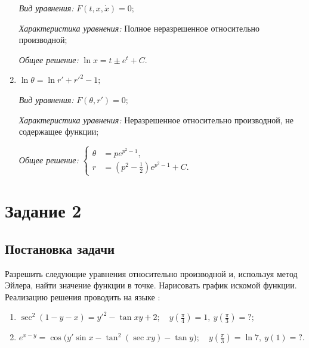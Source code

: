 \documentclass[14pt, a4paper, titlepage, fleqn]{extarticle}
\begin{document}
\begin{enumerate}
                    \textit{Вид уравнения:} \( F \left( t, x, \dot{x} \right) = 0; \)

                    \textit{Характеристика уравнения:}
                        Полное неразрешенное относительно производной;

                    \textit{Общее решение:} \( \ln{x} = t \pm e^t + C. \)

                
                \item \( \ln{\theta} = \ln{r'} + r'^2 - 1; \)
                
                    \textit{Вид уравнения:} \( F \left( \theta, r' \right) = 0; \)

                    \textit{Характеристика уравнения:}
                        Неразрешенное относительно производной, не содержащее функции;

                    \textit{Общее решение:}
                        \(
                            \left\lbrace
                                \begin{aligned}
                                    \theta &= p e^{p^2-1}, \\
                                    r &= \left( p^2 - \frac{1}{2} \right) e^{p^2-1} + C.
                                \end{aligned}
                            \right.    
                        \)

            \end{enumerate}

            
    \pagebreak

    \section{Задание 2}
        \subsection{Постановка задачи}
            Разрешить следующие уравнения относительно производной и, 
            используя метод Эйлера, найти значение функции в точке. 
            Нарисовать график искомой функции. 
            Реализацию решения проводить на языке :

            \begin{enumerate}
                \item \( \sec^2{(1 -y- x)} = y'^2 - \tan{xy} + 2; \quad y \left( \frac{\pi}{4} \right) = 1, ~ y \left( \frac{\pi}{3} \right) = ?;  \)
                \item \( e^{x-y} = \cos\big( y' \sin{x} - \tan^2(\sec{xy}) - \tan{y} \big); \quad y \left( \frac{\pi}{3} \right) = \ln 7, ~ y(1) = ?. \)
            \end{enumerate}
\end{document}
